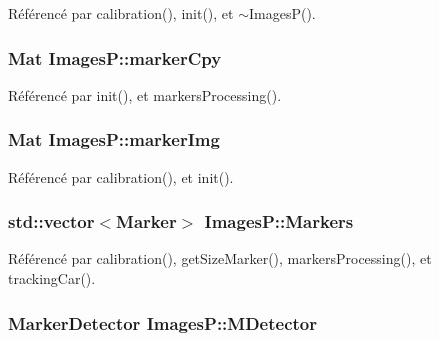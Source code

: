 Référencé par calibration(), init(), et $\sim$\-Images\-P().

\hypertarget{classImagesP_adc6b2ffa6cbfab6c1b83ed4bef74f1b9}{
\subsubsection[{marker\-Cpy}]{\setlength{\rightskip}{0pt plus 5cm}Mat Images\-P\-::marker\-Cpy\hspace{0.3cm}{\ttfamily [private]}}}\label{classImagesP_adc6b2ffa6cbfab6c1b83ed4bef74f1b9}


Référencé par init(), et markers\-Processing().

\hypertarget{classImagesP_add620ec27d299fe470cade4a6bc1e632}{
\subsubsection[{marker\-Img}]{\setlength{\rightskip}{0pt plus 5cm}Mat Images\-P\-::marker\-Img\hspace{0.3cm}{\ttfamily [private]}}}\label{classImagesP_add620ec27d299fe470cade4a6bc1e632}


Référencé par calibration(), et init().

\hypertarget{classImagesP_ac2813bc8a3edac420df686902806172c}{
\subsubsection[{Markers}]{\setlength{\rightskip}{0pt plus 5cm}std\-::vector$<$Marker$>$ Images\-P\-::\-Markers\hspace{0.3cm}{\ttfamily [private]}}}\label{classImagesP_ac2813bc8a3edac420df686902806172c}


Référencé par calibration(), get\-Size\-Marker(), markers\-Processing(), et tracking\-Car().

\hypertarget{classImagesP_a43a0e66ed75a147c27474937f8c9112c}{
\subsubsection[{M\-Detector}]{\setlength{\rightskip}{0pt plus 5cm}Marker\-Detector Images\-P\-::\-M\-Detector\hspace{0.3cm}{\ttfamily [private]}}}\label{classImagesP_a43a0e66ed75a147c27474937f8c9112c}


